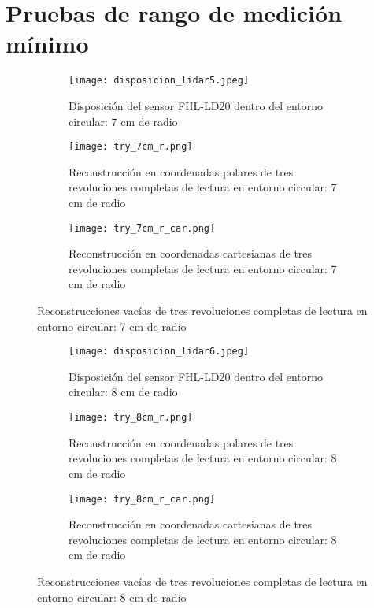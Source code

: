\section{Pruebas de rango de medición mínimo}
\begin{figure}[H]
	\centering
	\begin{subfigure}{0.6\textwidth}
		\centering
		\texttt{[image: disposicion\_lidar5.jpeg]}
		\caption{Disposición del sensor FHL-LD20 dentro del entorno circular: 7 cm de radio}
		\label{disposicion_lidar5}
		\vspace{1em}
	\end{subfigure}
	\begin{subfigure}{0.45\textwidth}
		\centering
		\texttt{[image: try\_7cm\_r.png]}
		\caption{Reconstrucción en coordenadas polares de tres revoluciones completas de lectura en entorno circular: 7 cm de radio}
		\label{try_7cm_r}
	\end{subfigure}
	\hspace{1em}
	\begin{subfigure}{0.45\textwidth}
		\centering
		\texttt{[image: try\_7cm\_r\_car.png]}
		\caption{Reconstrucción en coordenadas cartesianas de tres revoluciones completas de lectura en entorno circular: 7 cm de radio}
		\label{try_7cm_r_car}
	\end{subfigure}
	\caption{Reconstrucciones vacías de tres revoluciones completas de lectura en entorno circular: 7 cm de radio}
	\label{fig: reconstrucciones_vacías_7}
\end{figure}

\begin{figure}[H]
	\centering
	\begin{subfigure}{0.6\textwidth}
		\centering
		\texttt{[image: disposicion\_lidar6.jpeg]}
		\caption{Disposición del sensor FHL-LD20 dentro del entorno circular: 8 cm de radio}
		\label{disposicion_lidar6}
		\vspace{1em}
	\end{subfigure}
	\begin{subfigure}{0.45\textwidth}
		\centering
		\texttt{[image: try\_8cm\_r.png]}
		\caption{Reconstrucción en coordenadas polares de tres revoluciones completas de lectura en entorno circular: 8 cm de radio}
		\label{try_8cm_r}
	\end{subfigure}
	\hspace{1em}
	\begin{subfigure}{0.45\textwidth}
		\centering
		\texttt{[image: try\_8cm\_r\_car.png]}
		\caption{Reconstrucción en coordenadas cartesianas de tres revoluciones completas de lectura en entorno circular: 8 cm de radio}
		\label{try_8cm_r_car}
	\end{subfigure}
	\caption{Reconstrucciones vacías de tres revoluciones completas de lectura en entorno circular: 8 cm de radio}
	\label{fig: reconstrucciones_vacías_8}
\end{figure}


